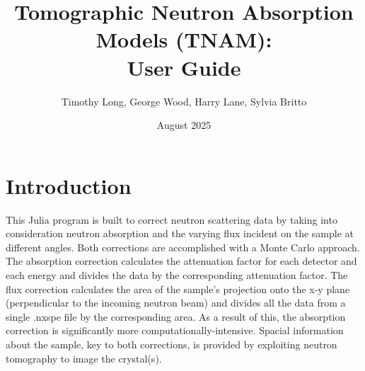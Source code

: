 \documentclass{article}
\title{Tomographic Neutron Absorption Models (TNAM): \\ User Guide}
\author{Timothy Long, George Wood, Harry Lane, Sylvia Britto}
\date{August 2025}
\begin{document}
\maketitle

\section{Introduction}
This Julia program is built to correct neutron scattering data by taking into consideration neutron absorption and the varying flux incident on the sample at different angles. Both corrections are accomplished with a Monte Carlo approach. The absorption correction calculates the attenuation factor for each detector and each energy and divides the data by the corresponding attenuation factor. The flux correction calculates the area of the sample's projection onto the x-y plane (perpendicular to the incoming neutron beam) and divides all the data from a single .nxspe file by the corresponding area. As a result of this, the absorption correction is significantly more computationally-intensive. Spacial information about the sample, key to both corrections, is provided by exploiting neutron tomography to image the crystal(s).
\end{document}
